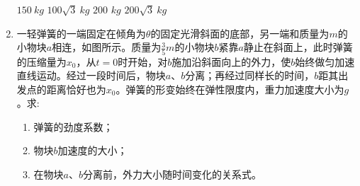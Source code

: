 \begin{enumerate}[leftmargin=0em]
\fourchoices
{$ 150 \ kg $}
{$ 100\sqrt{3} \ kg $	}
{$ 200 $ $ kg $}
{$ 200\sqrt{3} \ kg $}



\item 
{}
一轻弹簧的一端固定在倾角为$ \theta $的固定光滑斜面的底部，另一端和质量为$ m $的小物块$ a $相连，如图所示。质量为$ \frac{ 3 }{ 5 } m $的小物块$ b $紧靠$ a $静止在斜面上，此时弹簧的压缩量为$ x_{0} $，从$ t=0 $时开始，对$ b $施加沿斜面向上的外力，使$ b $始终做匀加速直线运动。经过一段时间后，物块$ a $、$ b $分离；再经过同样长的时间，$ b $距其出发点的距离恰好也为$ x_{0} $。弹簧的形变始终在弹性限度内，重力加速度大小为$ g $。求:
\begin{enumerate}
\renewcommand{\labelenumi}{\arabic{enumi}.}
\item
弹簧的劲度系数；
\item 
物块$ b $加速度的大小；
\item 
在物块$ a $、$ b $分离前，外力大小随时间变化的关系式。


\end{enumerate}
\begin{figure}[h!]
\flushright

\end{figure}










\end{enumerate}



